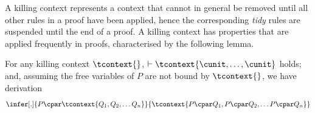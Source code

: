 \documentclass[UKenglish,acmsmall,authorversion]{acmart}
\theoremstyle{plain}
\begin{document}
A killing context represents a context that cannot in general be removed until all other rules in a proof have been applied, hence the corresponding \textit{tidy} rules are suspended until the end of a proof.  A killing context has properties that are applied frequently in proofs, characterised by the following lemma. %
\begin{lemma}\label{lemma:kill-distribute}
For any killing context $\tcontext{}$, $\vdash \tcontext{\cunit, \hdots, \cunit}$ holds; and, assuming the free variables of $P$ are not bound by $\tcontext{}$,
we have derivation
\[
\infer[.]{
P \cpar \tcontext{Q_1, Q_2, \hdots Q_n}
}{
\tcontext{P \cpar Q_1, P \cpar Q_2, \hdots P \cpar Q_n}
}
\]
\end{lemma}
\end{document}
